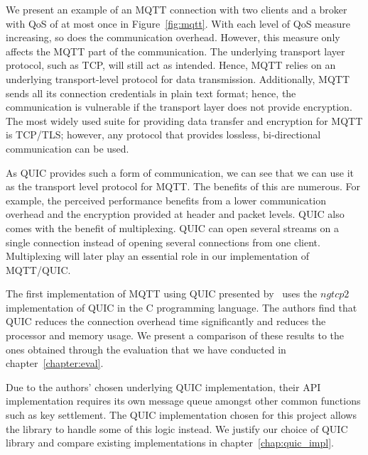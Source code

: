 We present an example of an MQTT connection with two clients and a broker with QoS of at most once in Figure~\ref{fig:mqtt}.
With each level of QoS measure increasing, so does the communication overhead.
However, this measure only affects the MQTT part of the communication.
The underlying transport layer protocol, such as TCP, will still act as intended.
Hence, MQTT relies on an underlying transport-level protocol for data transmission.
Additionally, MQTT sends all its connection credentials in plain text format; hence, the communication is vulnerable if the transport layer does not provide encryption.
The most widely used suite for providing data transfer and encryption for MQTT is TCP/TLS; however, any protocol that provides lossless, bi-directional communication can be used.

As QUIC provides such a form of communication, we can see that we can use it as the transport level protocol for MQTT.
The benefits of this are numerous. 
For example, the perceived performance benefits from a lower communication overhead and the encryption provided at header and packet levels.
QUIC also comes with the benefit of multiplexing.
QUIC can open several streams on a single connection instead of opening several connections from one client.
Multiplexing will later play an essential role in our implementation of MQTT/QUIC.

The first implementation of MQTT using QUIC presented by~\cite{kumar_implementation_2019} uses the $ngtcp2$ implementation of QUIC in the C programming language.
The authors find that QUIC reduces the connection overhead time significantly and reduces the processor and memory usage.
We present a comparison of these results to the ones obtained through the evaluation that we have conducted in chapter~\ref{chapter:eval}.

Due to the authors' chosen underlying QUIC implementation, their API implementation requires its own message queue amongst other common functions such as key settlement.
The QUIC implementation chosen for this project allows the library to handle some of this logic instead.
We justify our choice of QUIC library and compare existing implementations in chapter~\ref{chap:quic_impl}.